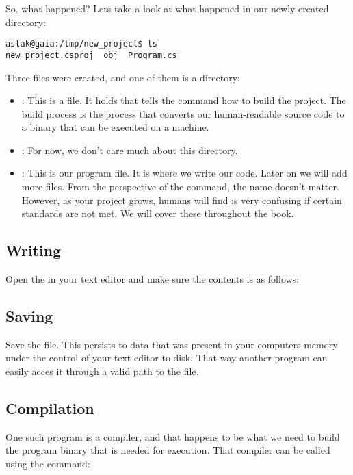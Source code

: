 So, what happened? Lets take a look at what happened in our newly created directory:

\begin{verbatim}
aslak@gaia:/tmp/new_project$ ls
new_project.csproj  obj  Program.cs
\end{verbatim}

Three files were created, and one of them is a directory:
\begin{itemize}
  \item {}: This is a  file. It holds  that tells the  command how to build the project. The build process is the process that converts our human-readable source code to a binary that can be executed on a machine.
  \item {}: For now, we don't care much about this directory.
  \item {}: This is our program file. It is where we write our code. Later on we will add more files. From the perspective of the  command, the name doesn't matter. However, as your project grows, humans will find is very confusing if certain standards are not met. We will cover these throughout the book.
\end{itemize}

\subsection{Writing}

Open the  in your text editor and make sure the contents is as follows:


\subsection{Saving}

Save the file. This persists to data that was present in your computers memory under the control of your text editor to disk. That way another program can easily acces it through a valid path to the file.

\subsection{Compilation}

One such program is a compiler, and that happens to be what we need to build the program binary that is needed for execution. That compiler can be called using the  command:

